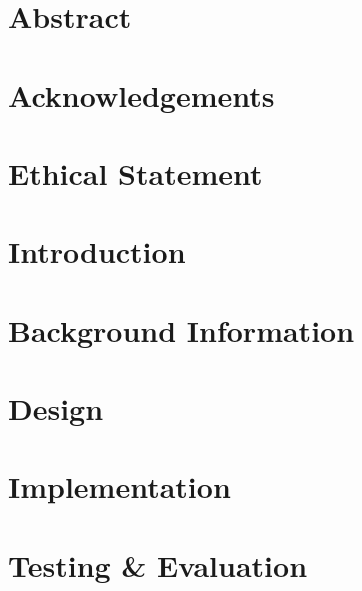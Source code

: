\documentclass[12pt]{article}
\begin{document}
\pagebreak

\section*{Abstract}


\pagebreak

\section*{Acknowledgements}

\vfill
\section*{Ethical Statement}


\pagebreak

\tableofcontents

\pagebreak

\listoffigures
\pagebreak
\listoftables

\pagebreak


\section{Introduction}
\label{introduction}


\section{Background Information}
\label{background}


\section{Design}
\label{design}


\section{Implementation}
\label{implementation}


\section{Testing \& Evaluation}
\label{testing}

\end{document}

